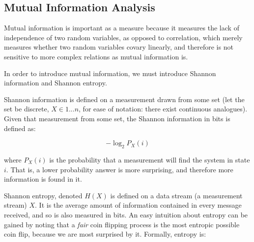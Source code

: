 \documentclass[12pt]{article}
\begin{document}




\subsection{Mutual Information Analysis}

Mutual information is important as a measure because it measures the lack of independence of two random variables, as opposed to correlation, which merely measures whether two random variables covary linearly, and therefore is not sensitive to more complex relations as mutual information is.

In order to introduce mutual information, we must introduce Shannon information and Shannon entropy\cite{nnmi}.

Shannon information is defined on a measurement drawn from some set (let the set be discrete, $X \in {1 ... n}$, for ease of notation: there exist continuous analogues). Given that measurement from some set, the Shannon information in bits is defined as:

$$ -\log_2 P_X(i) $$

where $P_X(i)$ is the probability that a measurement will find the system in state $i$. That is, a lower probability answer is more surprising, and therefore more information is found in it.

Shannon entropy, denoted $H(X)$ is defined on a data stream (a measurement stream) $X$. It is the average amount of information contained in every message received, and so is also measured in bits. An easy intuition about entropy can be gained by noting that a \emph{fair} coin flipping process is the most entropic possible coin flip, because we are most surprised by it. Formally, entropy is:
\end{document}
